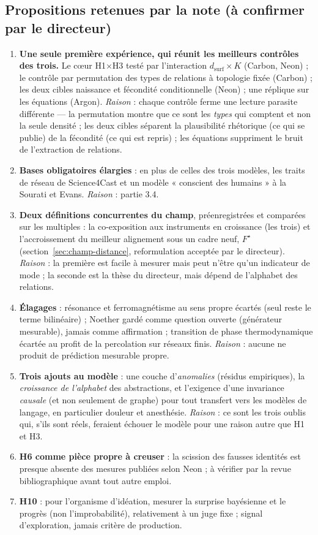 \documentclass[a4paper,11pt]{article}
\begin{document}
\subsection{Propositions retenues par la note (à confirmer par le directeur)}
\begin{enumerate}[itemsep=3pt]
\item \textbf{Une seule première expérience, qui réunit les meilleurs contrôles des trois.} Le cœur H1$\times$H3 testé par l'interaction $d_{\text{surf}}\times K$ (Carbon, Neon) ; le contrôle par permutation des types de relations à topologie fixée (Carbon) ; les deux cibles naissance et fécondité conditionnelle (Neon) ; une réplique sur les équations (Argon). \emph{Raison} : chaque contrôle ferme une lecture parasite différente — la permutation montre que ce sont les \emph{types} qui comptent et non la seule densité ; les deux cibles séparent la plausibilité rhétorique (ce qui se publie) de la fécondité (ce qui est repris) ; les équations suppriment le bruit de l'extraction de relations.
\item \textbf{Bases obligatoires élargies} : en plus de celles des trois modèles, les traits de réseau de Science4Cast et un modèle « conscient des humains » à la Sourati et Evans. \emph{Raison} : partie 3.4.
\item \textbf{Deux définitions concurrentes du champ}, préenregistrées et comparées sur les multiples : la co-exposition aux instruments en croissance (les trois) et l'accroissement du meilleur alignement sous un cadre neuf, $F^\star$ (section~\ref{sec:champ-distance}, reformulation acceptée par le directeur). \emph{Raison} : la première est facile à mesurer mais peut n'être qu'un indicateur de mode ; la seconde est la thèse du directeur, mais dépend de l'alphabet des relations.
\item \textbf{Élagages} : résonance et ferromagnétisme au sens propre écartés (seul reste le terme bilinéaire) ; Noether gardé comme question ouverte (générateur mesurable), jamais comme affirmation ; transition de phase thermodynamique écartée au profit de la percolation sur réseaux finis. \emph{Raison} : aucune ne produit de prédiction mesurable propre.
\item \textbf{Trois ajouts au modèle} : une couche d'\emph{anomalies} (résidus empiriques), la \emph{croissance de l'alphabet} des abstractions, et l'exigence d'une invariance \emph{causale} (et non seulement de graphe) pour tout transfert vers les modèles de langage, en particulier douleur et anesthésie. \emph{Raison} : ce sont les trois oublis qui, s'ils sont réels, feraient échouer le modèle pour une raison autre que H1 et H3.
\item \textbf{H6 comme pièce propre à creuser} : la scission des fausses identités est presque absente des mesures publiées selon Neon ; à vérifier par la revue bibliographique avant tout autre emploi.
\item \textbf{H10} : pour l'organisme d'idéation, mesurer la surprise bayésienne et le progrès (non l'improbabilité), relativement à un juge fixe ; signal d'exploration, jamais critère de production.
\end{enumerate}
\clearpage
\end{document}
